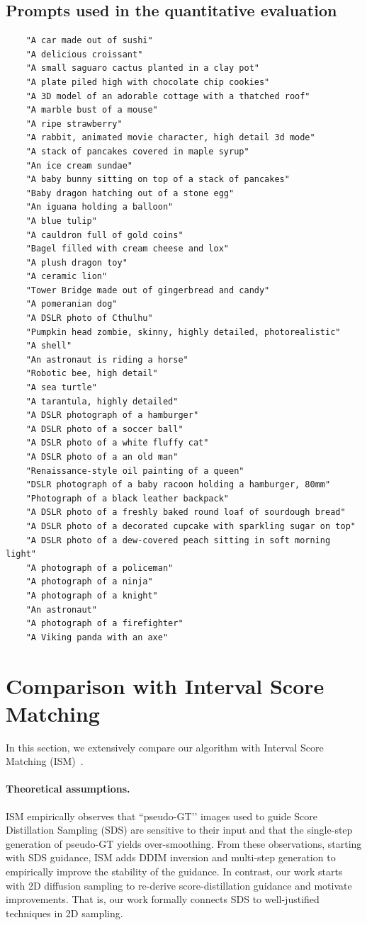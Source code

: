 \subsection{Prompts used in the quantitative evaluation}
\begin{verbatim}
    "A car made out of sushi"
    "A delicious croissant"
    "A small saguaro cactus planted in a clay pot"
    "A plate piled high with chocolate chip cookies"
    "A 3D model of an adorable cottage with a thatched roof"
    "A marble bust of a mouse"
    "A ripe strawberry"
    "A rabbit, animated movie character, high detail 3d mode"
    "A stack of pancakes covered in maple syrup"
    "An ice cream sundae"
    "A baby bunny sitting on top of a stack of pancakes"
    "Baby dragon hatching out of a stone egg"
    "An iguana holding a balloon"
    "A blue tulip"
    "A cauldron full of gold coins"
    "Bagel filled with cream cheese and lox"
    "A plush dragon toy"
    "A ceramic lion"
    "Tower Bridge made out of gingerbread and candy"
    "A pomeranian dog"
    "A DSLR photo of Cthulhu"
    "Pumpkin head zombie, skinny, highly detailed, photorealistic"
    "A shell"
    "An astronaut is riding a horse"
    "Robotic bee, high detail"
    "A sea turtle"
    "A tarantula, highly detailed"
    "A DSLR photograph of a hamburger"
    "A DSLR photo of a soccer ball"
    "A DSLR photo of a white fluffy cat" 
    "A DSLR photo of a an old man"
    "Renaissance-style oil painting of a queen"
    "DSLR photograph of a baby racoon holding a hamburger, 80mm"
    "Photograph of a black leather backpack"
    "A DSLR photo of a freshly baked round loaf of sourdough bread"
    "A DSLR photo of a decorated cupcake with sparkling sugar on top"
    "A DSLR photo of a dew-covered peach sitting in soft morning light"
    "A photograph of a policeman"
    "A photograph of a ninja"
    "A photograph of a knight"
    "An astronaut"
    "A photograph of a firefighter"
    "A Viking panda with an axe"
\end{verbatim}

\section{Comparison with Interval Score Matching}
\label{sec:ism_comparison}
In this section, we extensively compare our algorithm with Interval Score Matching (ISM)~\cite{liang2023luciddreamer}.

\paragraph{Theoretical assumptions.}
ISM empirically observes that ``pseudo-GT’’ images used to guide Score Distillation Sampling (SDS) are sensitive to their input and that the single-step generation of pseudo-GT yields over-smoothing.
From these observations, starting with SDS guidance, ISM adds DDIM inversion and multi-step generation to empirically improve the stability of the guidance.
In contrast, our work starts with 2D diffusion sampling to re-derive score-distillation guidance and motivate improvements.
That is, our work formally connects SDS to well-justified techniques in 2D sampling.

